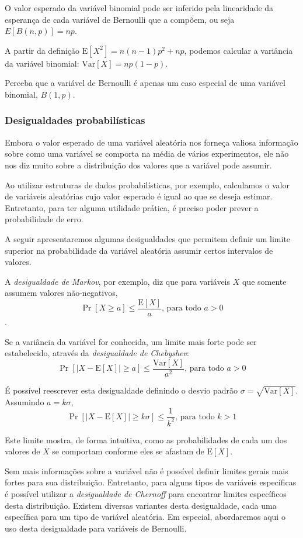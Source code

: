 O valor esperado da variável binomial pode ser inferido pela linearidade da esperança de cada variável de Bernoulli que a compõem, ou seja $E[B(n, p)] = np$. 

A partir da definição $\text{E}[X^2] = n (n-1) p^2 + np$, podemos calcular a variância da variável binomial: $\text{Var}[X] = np(1-p)$.

Perceba que a variável de Bernoulli é apenas um caso especial de uma variável binomial, $B(1, p)$.

\subsubsection{Desigualdades probabilísticas}

Embora o valor esperado de uma variável aleatória nos forneça valiosa informação sobre como uma variável se comporta na média de vários experimentos, ele não nos diz muito sobre a distribuição dos valores que a variável pode assumir.

Ao utilizar estruturas de dados probabilísticas, por exemplo, calculamos o valor de variáveis aleatórias cujo valor esperado é igual ao que se deseja estimar. Entretanto, para ter alguma utilidade prática, é preciso poder prever a probabilidade de erro.

A seguir apresentaremos algumas desigualdades que permitem definir um limite superior na probabilidade da variável aleatória assumir certos intervalos de valores.

A \emph{desigualdade de Markov}, por exemplo, diz que para variáveis $X$ que somente assumem valores não-negativos,
\[
    \Pr[X \geq a] \leq \frac{\text{E}[X]}{a} \text{, para todo } a > 0
\].

Se a variância da variável for conhecida, um limite mais forte pode ser estabelecido, através da \emph{desigualdade de Chebyshev}:
\[
    \Pr[|X - \text{E}[X]| \geq a] \leq \frac{\text{Var}[X]}{a^2} \text{, para todo } a > 0
\]

É possível reescrever esta desigualdade definindo o desvio padrão $\sigma = \sqrt{\text{Var}[X]}$. Assumindo $a = k\sigma$,
\[
    \Pr[|X - \text{E}[X]| \geq k\sigma] \leq \frac{1}{k^2} \text{, para todo } k > 1
\]

Este limite mostra, de forma intuitiva, como as probabilidades de cada um dos valores de $X$ se comportam conforme eles se afastam de $\text{E}[X]$.

Sem mais informações sobre a variável não é possível definir limites gerais mais fortes para sua distribuição. Entretanto, para alguns tipos de variáveis específicas é possível utilizar a \emph{desigualdade de Chernoff} para encontrar limites específicos desta distribuição. Existem diversas variantes desta desigualdade, cada uma específica para um tipo de variável aleatória. Em especial, abordaremos aqui o uso desta desigualdade para variáveis de Bernoulli.

